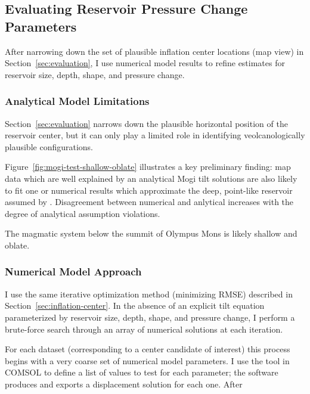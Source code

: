 \subsection{Evaluating Reservoir Pressure Change Parameters}

After narrowing down the set of plausible inflation center locations (map view) in Section~\ref{sec:evaluation}, I use numerical model results to refine estimates for reservoir size, depth, shape, and pressure change.

\subsubsection{Analytical Model Limitations}

Section~\ref{sec:evaluation} narrows down the plausible horizontal position of the reservoir center, but it can only play a limited role in identifying veolcanologically plausible configurations.

Figure~\ref{fig:mogi-test-shallow-oblate} illustrates a key preliminary finding: map data which are well explained by an analytical Mogi tilt solutions are also likely to fit one or numerical results which approximate the deep, point-like reservoir assumed by \textcite{mogi_relations_1958}. Disagreement between numerical and anlytical increases with the degree of analytical assumption violations.

The magmatic system below the summit of Olympus Mons is likely shallow and oblate. 

\subsubsection{Numerical Model Approach}

I use the same iterative optimization method (minimizing \acs{RMSE}) described in Section~\ref{sec:inflation-center}. In the absence of an explicit tilt equation parameterized by reservoir size, depth, shape, and pressure change, I perform a brute-force search through an array of numerical solutions at each iteration.

For each dataset (corresponding to a center candidate of interest) this process begins with a very coarse set of numerical model parameters. I use the  tool in COMSOL to define a list of values to test for each parameter; the software produces and exports a displacement solution for each one. After